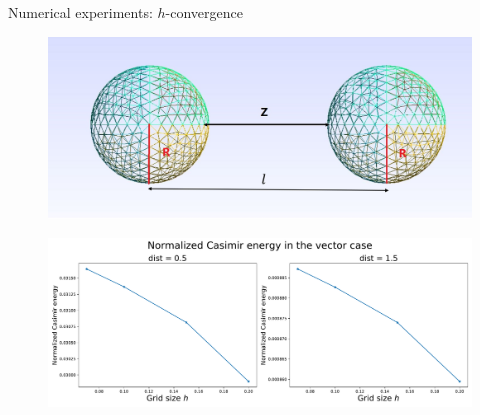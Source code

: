 \documentclass[dvipsnames,10pt]{beamer}
\begin{document}
\begin{frame}{Numerical experiments: $h$-convergence}
\vspace{.3cm}
\begin{figure}
    \centering
    \includegraphics[scale = 0.2]{figs/Picture1.png}
\end{figure}
\begin{figure}
    \centering
    \includegraphics[scale = 0.3]{figs/CasE_vector.pdf}
\end{figure}
    
\end{frame}
\end{document}
